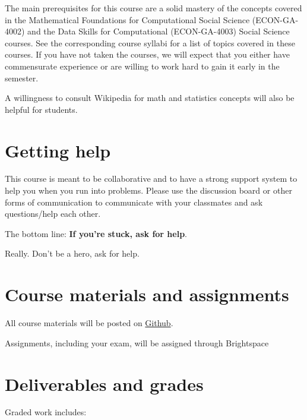 \documentclass[12pt,pdftex,twoside,letterpaper]{exam}
\begin{document}
    The main prerequisites for this course are a solid mastery of the concepts covered in the
    Mathematical Foundations for Computational Social Science (ECON-GA-4002) and the Data Skills for Computational (ECON-GA-4003)
    Social Science courses. See the corresponding course syllabi for a list of topics covered in
    these courses. If you have not taken the courses, we will expect that you either have commensurate experience or are willing to work hard to gain it early in the semester.

    A willingness to consult Wikipedia for math and statistics concepts will also be helpful for
    students.

  \section*{Getting help}

    This course is meant to be collaborative and to have a strong support system to help you when
    you run into problems. Please use the discussion board or other forms of communication to
    communicate with your classmates and ask questions/help each other.

    The bottom line:  {\bf If you're stuck, ask for help\/}.

    Really.  Don't be a hero, ask for help.

  \section*{Course materials and assignments}

    All course materials will be posted on \href{https://github.com/NYU-ComputationalSocialScience/ECON-GA-4005-S2023}{Github}.

    Assignments, including your exam, will be assigned through Brightspace

  \section*{Deliverables and grades}

    Graded work includes:
\end{document}
